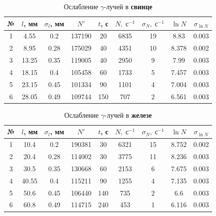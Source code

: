 \documentclass[12pt]{kiarticle} %
\newcommand{\ga}{\ensuremath{\gamma}}
\begin{document}
\begin{table}[h!]
	\caption{Ослабление \ga-лучей в \textbf{свинце}}
	\begin{center}
		\begin{tabular}{|c|c|c|c|c|c|c|c|c|}
			\hline
			№ & $ l $, мм & $ \sigma_l $, мм & $ N' $ & $ t $, с & $ N, \; с^{-1}$  & $ \sigma_N, \; с^{-1}$ & $ \ln N $ & $ \sigma_{\ln N} $ \\
			\hline
			1 & 4.55 & 0.2 & 137190 & 20 & 6835 & 19 & 8.83 & 0.003 \\
			2 & 8.95 & 0.28 & 175029 & 40 & 4351 & 10 & 8.378 & 0.002 \\
			3 & 13.25 & 0.35 & 119005 & 40 & 2950 & 9 & 7.99 & 0.003 \\
			4 & 18.15 & 0.4 & 105458 & 60 & 1733 & 5 & 7.457 & 0.003 \\
			5 & 23.15 & 0.45 & 101334 & 90 & 1101 & 4 & 7.004 & 0.003 \\
			6 & 28.05 & 0.49 & 109744 & 150 & 707 & 2 & 6.561 & 0.003 \\
			\hline
		\end{tabular}
	\end{center}
	\label{table_1}
\end{table}

\begin{table}[h!]
	\caption{Ослабление \ga-лучей в \textbf{железе}}
	\begin{center}
		\begin{tabular}{|c|c|c|c|c|c|c|c|c|}
			\hline
			№ & $ l $, мм & $ \sigma_l $, мм & $ N' $ & $ t $, с & $ N, \; с^{-1}$  & $ \sigma_N, \; с^{-1}$ & $ \ln N $ & $ \sigma_{\ln N} $ \\
			\hline
			1 & 10.4 & 0.2 & 190381 & 30 & 6321 & 15 & 8.752 & 0.002 \\
			2 & 20.4 & 0.28 & 114002 & 30 & 3775 & 11 & 8.236 & 0.003 \\
			3 & 30.5 & 0.35 & 130668 & 60 & 2153 & 6 & 7.675 & 0.003 \\
			4 & 40.55 & 0.4 & 115211 & 90 & 1255 & 4 & 7.135 & 0.003 \\
			5 & 50.6 & 0.45 & 106440 & 140 & 735 & 2 & 6.6 & 0.003 \\
			6 & 60.8 & 0.49 & 114715 & 240 & 453 & 1 & 6.116 & 0.003 \\
			\hline
		\end{tabular}
	\end{center}
	\label{table_2}
\end{table}
\end{document}
